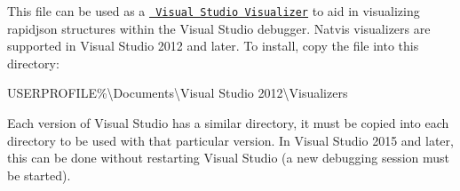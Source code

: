 This file can be used as a \href{https://docs.microsoft.com/en-gb/visualstudio/debugger/create-custom-views-of-native-objects}{\texttt{ Visual Studio Visualizer}} to aid in visualizing rapidjson structures within the Visual Studio debugger. Natvis visualizers are supported in Visual Studio 2012 and later. To install, copy the file into this directory\+:

{\ttfamily USERPROFILE\%\textbackslash{}Documents\textbackslash{}Visual Studio 2012\textbackslash{}Visualizers}

Each version of Visual Studio has a similar directory, it must be copied into each directory to be used with that particular version. In Visual Studio 2015 and later, this can be done without restarting Visual Studio (a new debugging session must be started). 